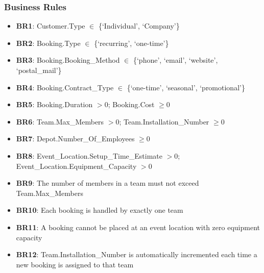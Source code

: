 \subsubsection{Business Rules}
\begin{itemize}
    \item \textbf{BR1}: Customer.Type $\in$ \{`Individual', `Company'\}
    \item \textbf{BR2}: Booking.Type $\in$ \{`recurring', `one-time'\}
    \item \textbf{BR3}: Booking.Booking\_Method $\in$ \{`phone', `email', `website', `postal\_mail'\}
    \item \textbf{BR4}: Booking.Contract\_Type $\in$ \{`one-time', `seasonal', `promotional'\}
    \item \textbf{BR5}: Booking.Duration $> 0$; Booking.Cost $\geq 0$
    \item \textbf{BR6}: Team.Max\_Members $> 0$; Team.Installation\_Number $\geq 0$
    \item \textbf{BR7}: Depot.Number\_Of\_Employees $\geq 0$
    \item \textbf{BR8}: Event\_Location.Setup\_Time\_Estimate $> 0$; Event\_Location.Equipment\_Capacity $> 0$
    \item \textbf{BR9}: The number of members in a team must not exceed Team.Max\_Members
    \item \textbf{BR10}: Each booking is handled by exactly one team
    \item \textbf{BR11}: A booking cannot be placed at an event location with zero equipment capacity
    \item \textbf{BR12}: Team.Installation\_Number is automatically incremented each time a new booking is assigned to that team
\end{itemize}
